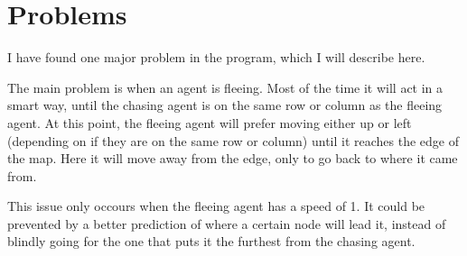 \section{Problems}
\label{04}

I have found one major problem in the program, which I will describe here.

The main problem is when an agent is fleeing. Most of the time it will act in a smart way, until the chasing agent is on the same row or column as the fleeing agent. At this point, the fleeing agent will prefer moving either up or left (depending on if they are on the same row or column) until it reaches the edge of the map. Here it will move away from the edge, only to go back to where it came from. 

This issue only occours when the fleeing agent has a speed of 1. It could be prevented by a better prediction of where a certain node will lead it, instead of blindly going for the one that puts it the furthest from the chasing agent.